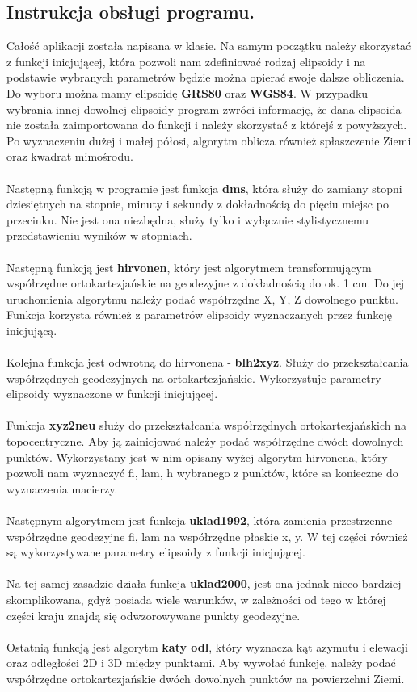 \documentclass[10pt,a4paper]{article}
\begin{document}
	\subsection{Instrukcja obsługi programu.}
	Całość aplikacji została napisana w klasie. Na samym początku należy skorzystać z funkcji inicjującej, która pozwoli nam zdefiniować rodzaj elipsoidy i na podstawie wybranych parametrów będzie można opierać swoje dalsze obliczenia. Do wyboru można mamy elipsoidę \textbf{GRS80} oraz \textbf{WGS84}. W przypadku wybrania innej dowolnej elipsoidy program zwróci informację, że dana elipsoida nie została zaimportowana do funkcji i należy skorzystać z którejś z powyższych. Po wyznaczeniu dużej i małej półosi, algorytm oblicza również spłaszczenie Ziemi oraz kwadrat mimośrodu.\\
	\\
	Następną funkcją w programie jest funkcja \textbf{dms}, która służy do zamiany stopni dziesiętnych na stopnie, minuty i sekundy z dokładnością do pięciu miejsc po przecinku. Nie jest ona niezbędna, służy tylko i wyłącznie stylistycznemu  przedstawieniu wyników w stopniach. \\
	\\
	Następną funkcją jest \textbf{hirvonen}, który jest algorytmem transformującym współrzędne ortokartezjańskie na geodezyjne z dokładnością do ok. 1 cm. Do jej uruchomienia algorytmu należy podać współrzędne X, Y, Z dowolnego punktu. Funkcja korzysta również z parametrów elipsoidy wyznaczanych przez funkcję inicjującą. \\
	\\
	Kolejna funkcja jest odwrotną do hirvonena - \textbf{blh2xyz}. Służy do przekształcania współrzędnych geodezyjnych na ortokartezjańskie. Wykorzystuje parametry elipsoidy wyznaczone w funkcji inicjującej. \\
	\\
	Funkcja \textbf{xyz2neu} służy do przekształcania współrzędnych ortokartezjańskich na topocentryczne. Aby ją zainicjować należy podać współrzędne dwóch dowolnych punktów. Wykorzystany jest w nim opisany wyżej algorytm hirvonena, który pozwoli nam wyznaczyć fi, lam, h wybranego z punktów, które sa konieczne do wyznaczenia macierzy. \\
	\\
	Następnym algorytmem jest funkcja \textbf{uklad1992}, która zamienia przestrzenne współrzędne geodezyjne fi, lam na współrzędne płaskie x, y. W tej części również są wykorzystywane parametry elipsoidy z funkcji inicjującej. \\
	\\
	Na tej samej zasadzie działa funkcja \textbf{uklad2000}, jest ona jednak nieco bardziej skomplikowana, gdyż posiada wiele warunków, w zależności od tego w której części kraju znajdą się odwzorowywane punkty geodezyjne. \\
	\\
	Ostatnią funkcją jest algorytm \textbf{katy odl}, który wyznacza kąt azymutu i elewacji oraz odległości 2D i 3D między punktami. Aby wywołać funkcję, należy podać współrzędne ortokartezjańskie dwóch dowolnych punktów na powierzchni Ziemi. \\
	\newpage
	
\end{document}
